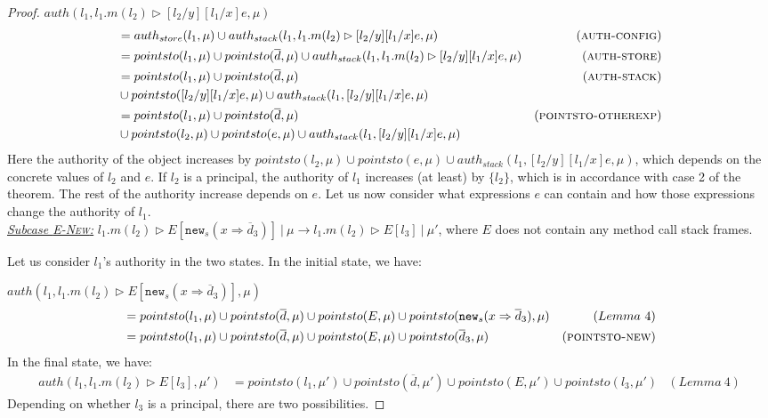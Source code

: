 \documentclass{llncs}
\newcommand{\keywadj}[1]{\mathtt{#1}}
\begin{document}
\begin{proof}
\noindent$auth(l_1, l_1.m(l_2) \rhd [l_2/y][l_1/x]e, \mu)$
\vspace{-7pt}
\begin{align*}
&= auth_{store}(l_1, \mu) \cup auth_{stack}(l_1, l_1.m(l_2) \rhd [l_2/y][l_1/x]e, \mu) & (\textsc{auth-config})\\
&= pointsto(l_1, \mu) \cup pointsto(\overline{d}, \mu) \cup auth_{stack}(l_1, l_1.m(l_2) \rhd [l_2/y][l_1/x]e, \mu) & (\textsc{auth-store})\\
&= pointsto(l_1, \mu) \cup pointsto(\overline{d}, \mu) & (\textsc{auth-stack})\\
&\cup pointsto([l_2/y][l_1/x]e, \mu) \cup auth_{stack}(l_1, [l_2/y][l_1/x]e, \mu)\\
&= pointsto(l_1, \mu) \cup pointsto(\overline{d}, \mu) & (\textsc{pointsto-otherexp})\\
&\cup pointsto(l_2, \mu) \cup pointsto(e, \mu) \cup auth_{stack}(l_1, [l_2/y][l_1/x]e, \mu)
\end{align*}
Here the authority of the object increases by $pointsto(l_2, \mu) \cup pointsto(e, \mu) \cup auth_{stack}(l_1, [l_2/y][l_1/x]e, \mu)$, which depends on the concrete values of $l_2$ and $e$. If $l_2$ is a principal, the authority of $l_1$ increases (at least) by $\{ l_2 \}$, which is in accordance with case 2 of the theorem. The rest of the authority increase depends on $e$. Let us now consider what expressions $e$ can contain and how those expressions change the authority of $l_1$.\\

\noindent\underline{\textit{Subcase \textsc{E-New}:}}
$l_1.m(l_2) \rhd E[\keywadj{new}_s(x \Rightarrow \overline{d}_3)]~|~\mu \longrightarrow l_1.m(l_2) \rhd E[l_3]~|~\mu'$, where $E$ does not contain any method call stack frames.

\noindent Let us consider $l_1$'s authority in the two states. In the initial state, we have:

\noindent$auth(l_1, l_1.m(l_2) \rhd E[\keywadj{new}_s(x \Rightarrow \overline{d}_3)], \mu)$
\vspace{-7pt}
\begin{align*}
&= pointsto(l_1, \mu) \cup pointsto(\overline{d}, \mu) \cup pointsto(E, \mu) \cup pointsto(\keywadj{new}_s(x \Rightarrow \overline{d}_3), \mu) & (Lemma~4)\\
&= pointsto(l_1, \mu) \cup pointsto(\overline{d}, \mu) \cup pointsto(E, \mu) \cup pointsto(\overline{d}_3, \mu) & (\textsc{pointsto-new})
\end{align*}
In the final state, we have:
\begin{align*}
auth(l_1, l_1.m(l_2) \rhd E[l_3], \mu') &= pointsto(l_1, \mu') \cup pointsto(\overline{d}, \mu') \cup pointsto(E, \mu') \cup pointsto(l_3, \mu') & (Lemma~4)
\end{align*}
Depending on whether $l_3$ is a principal, there are two possibilities.


\end{proof}
\end{document}
